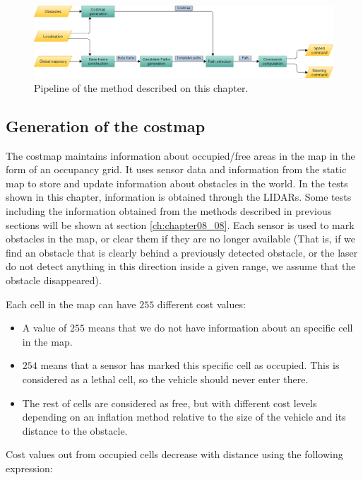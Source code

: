 \begin{figure}[h!]
        \centering
        \includegraphics[width=\textwidth]{pipeline}
        \caption{Pipeline of the method described on this chapter.}\label{fig:cp07_pipeline}
\end{figure}

\subsection{Generation of the costmap}\label{ch:chapter07_01_01}

The costmap maintains information about occupied/free areas in the map in the form of an occupancy grid. It uses sensor data and information from the static map to store and update information about obstacles in the world. In the tests shown in this chapter, information is obtained through the \acp{LIDAR}. Some tests including the information obtained from the methods described in previous sections will be shown at section \ref{ch:chapter08_08}. Each sensor is used to mark obstacles in the map, or clear them if they are no longer available (That is, if we find an obstacle that is clearly behind a previously detected obstacle, or the laser do not detect anything in this direction inside a given range, we assume that the obstacle disappeared).

Each cell in the map can have $255$ different cost values:
\begin{itemize}
 \item A value of $255$ means that we do not have information about an specific cell in the map.
 \item $254$ means that a sensor has marked this specific cell as occupied. This is considered as a lethal cell, so the vehicle should never enter there.
 \item The rest of cells are considered as free, but with different cost levels depending on an inflation method relative to the size of the vehicle and its distance to the obstacle.
\end{itemize}

Cost values out from occupied cells decrease with distance using the following expression:

